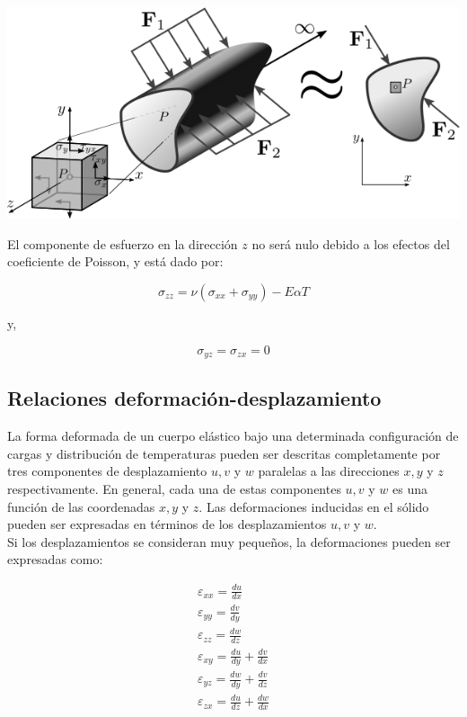 \begin{center}
\includegraphics[scale=0.55]{src/ch2/plane_strain.png}
\label{fig:fg2}
\end{center}

El componente de esfuerzo en la dirección $z$ no será nulo debido a los efectos del coeficiente de Poisson, y está 
dado por:

\begin{equation}
\sigma_{zz} = \nu(\sigma_{xx}+\sigma_{yy}) - E \alpha T
\end{equation}

y, 

\begin{equation}
\sigma_{yz} = \sigma_{zx} = 0
\end{equation}

\subsection{Relaciones deformación-desplazamiento}

La forma deformada de un cuerpo elástico bajo una determinada configuración de cargas y distribución de temperaturas 
pueden ser descritas completamente por tres componentes de desplazamiento $u, v$ y $w$ paralelas a las direcciones 
$x, y$ y $z$ respectivamente. En general, cada una de estas componentes $u,v$ y $w$ es una función de las 
coordenadas $x,y$ y $z$. Las deformaciones inducidas en el sólido pueden ser expresadas en términos de los 
desplazamientos $u,v$ y $w$.\\

Si los desplazamientos se consideran muy pequeños, la deformaciones pueden ser expresadas como:

\begin{subequations}
\begin{eqnarray}
\varepsilon_{xx} = \frac{du}{dx} \\
\varepsilon_{yy} = \frac{dv}{dy} \\
\varepsilon_{zz} = \frac{dw}{dz} \\
\varepsilon_{xy} = \frac{du}{dy} + \frac{dv}{dx} \\
\varepsilon_{yz} = \frac{dw}{dy} + \frac{dv}{dz} \\
\varepsilon_{zx} = \frac{du}{dz} + \frac{dw}{dx} \\
\end{eqnarray}
\end{subequations}

